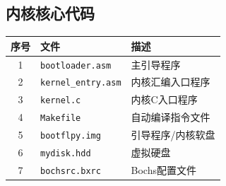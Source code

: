 \documentclass[logo,reportComp]{thesis}
\begin{document}
\subsection{内核核心代码}
\begin{center}
\begin{tabular}{|c|l|l|}\hline
\textbf{序号} & \textbf{文件} & \textbf{描述} \\\hline
1 & \verb'bootloader.asm' & 主引导程序\\\hline
2 & \verb'kernel_entry.asm' & 内核汇编入口程序\\\hline
3 & \verb'kernel.c' & 内核C入口程序\\\hline
4 & \verb'Makefile' & 自动编译指令文件\\\hline
5 & \verb'bootflpy.img' & 引导程序/内核软盘\\\hline
6 & \verb'mydisk.hdd' & 虚拟硬盘\\\hline
7 & \verb'bochsrc.bxrc' & Bochs配置文件\\\hline
\end{tabular}
\end{center}
\end{document}
